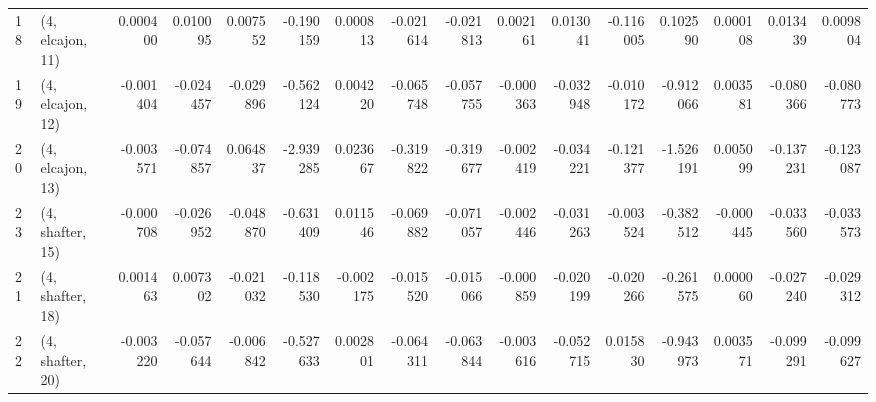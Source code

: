 \begin{tabular}{llrrrrrrrrrrrrrr}
18 &  (4, elcajon, 11) &   0.000400 &  0.010095 &  0.007552 &  -0.190159 &  0.000813 &  -0.021614 & -0.021813 &  0.002161 &  0.013041 & -0.116005 &   0.102590 &  0.000108 &  0.013439 &  0.009804 \\
19 &  (4, elcajon, 12) &  -0.001404 & -0.024457 & -0.029896 &  -0.562124 &  0.004220 &  -0.065748 & -0.057755 & -0.000363 & -0.032948 & -0.010172 &  -0.912066 &  0.003581 & -0.080366 & -0.080773 \\
20 &  (4, elcajon, 13) &  -0.003571 & -0.074857 &  0.064837 &  -2.939285 &  0.023667 &  -0.319822 & -0.319677 & -0.002419 & -0.034221 & -0.121377 &  -1.526191 &  0.005099 & -0.137231 & -0.123087 \\
23 &  (4, shafter, 15) &  -0.000708 & -0.026952 & -0.048870 &  -0.631409 &  0.011546 &  -0.069882 & -0.071057 & -0.002446 & -0.031263 & -0.003524 &  -0.382512 & -0.000445 & -0.033560 & -0.033573 \\
21 &  (4, shafter, 18) &   0.001463 &  0.007302 & -0.021032 &  -0.118530 & -0.002175 &  -0.015520 & -0.015066 & -0.000859 & -0.020199 & -0.020266 &  -0.261575 &  0.000060 & -0.027240 & -0.029312 \\
22 &  (4, shafter, 20) &  -0.003220 & -0.057644 & -0.006842 &  -0.527633 &  0.002801 &  -0.064311 & -0.063844 & -0.003616 & -0.052715 &  0.015830 &  -0.943973 &  0.003571 & -0.099291 & -0.099627 \\
\bottomrule
\end{tabular}

